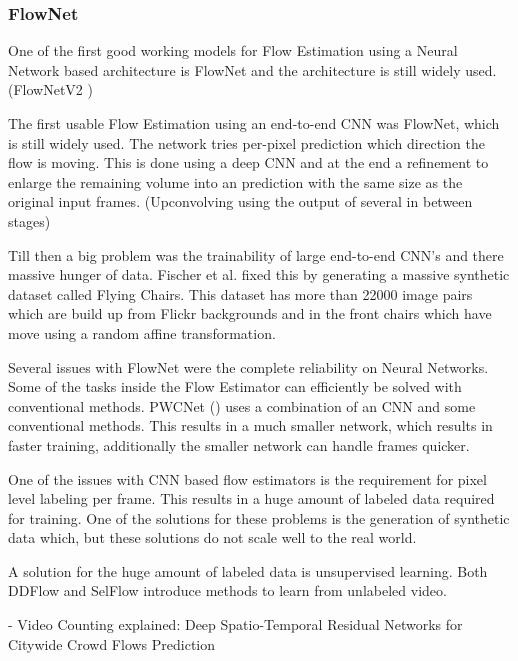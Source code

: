 \subsubsection{FlowNet}
One of the first good working models for Flow Estimation using a Neural Network based architecture is FlowNet \cite{fischer_flownet_2015} and the architecture is still widely used. (FlowNetV2 \cite{ilg_flownet_2016})

The first usable Flow Estimation using an end-to-end CNN was FlowNet, which is still widely used. The network tries per-pixel prediction which direction the flow is moving. This is done using a deep CNN and at the end a refinement to enlarge the remaining volume into an prediction with the same size as the original input frames. (Upconvolving using the output of several in between stages)

Till then a big problem was the trainability of large end-to-end CNN's and there massive hunger of data. Fischer et al. fixed this by generating a massive synthetic dataset called Flying Chairs. This dataset has more than 22000 image pairs which are build up from Flickr backgrounds and in the front chairs which have move using a random affine transformation.





Several issues with FlowNet were the complete reliability on Neural Networks. Some of the tasks inside the Flow Estimator can efficiently be solved with conventional methods. PWCNet (\cite{sun_pwc-net_2018}) uses a combination of an CNN and some conventional methods. This results in a much smaller network, which results in faster training, additionally the smaller network can handle frames quicker.

One of the issues with CNN based flow estimators is the requirement for pixel level labeling per frame. This results in a huge amount of labeled data required for training. One of the solutions for these problems is the generation of synthetic data which, but these solutions do not scale well to the real world.

A solution for the huge amount of labeled data is unsupervised learning. Both DDFlow \cite{liu_ddflow_2019} and SelFlow \cite{liu_selflow_2019} introduce methods to learn from unlabeled video.

- Video Counting explained: Deep Spatio-Temporal Residual Networks for Citywide Crowd Flows Prediction
